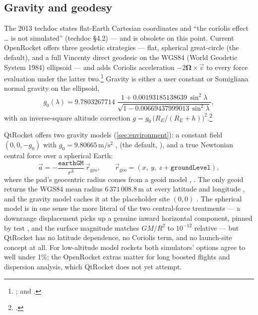 \subsection{Gravity and geodesy}\label{app:or-methods-gravity}

The 2013 techdoc states flat-Earth Cartesian coordinates and ``the coriolis effect \ldots{}
is not simulated'' (techdoc \S 4.2) --- and is obsolete on this point. Current OpenRocket
offers three geodetic strategies --- flat, spherical great-circle (the default), and a full
Vincenty direct geodesic on the WGS84 (World Geodetic System 1984) ellipsoid --- and adds
Coriolis acceleration $-2\boldsymbol{\Omega}\times\vec v$ to every force evaluation under
the latter two.\footnote{;
 and .}
Gravity is either a user constant or Somigliana normal gravity on the ellipsoid,
\begin{equation}
g_0(\lambda) = 9.7803267714\;
\frac{1 + 0.00193185138639\,\sin^2\lambda}{\sqrt{1 - 0.00669437999013\,\sin^2\lambda}},
\end{equation}
with an inverse-square altitude correction
$g = g_0\,\bigl(R_E/(R_E+h)\bigr)^2$.\footnote{.}

QtRocket offers two gravity models (\cref{sec:environment}): a constant field
$(0,0,-g_0)$ with $g_0 = 9.80665\,\mathrm{m/s^2}$ ,
 (the default, ), and a true
Newtonian central force over a spherical Earth:
\begin{equation}
\vec a = -\frac{\mathtt{earthGM}}{r^3}\,\vec r_{\mathrm{geo}},
\qquad \vec r_{\mathrm{geo}} = (x,\ y,\ z + \mathtt{groundLevel}),
\end{equation}
where the pad's geocentric radius comes from a geoid model
, . The only
geoid returns the WGS84 mean radius $6\,371\,008.8$\,m at every latitude and longitude
, and the gravity model caches it at the placeholder
site $(0,0)$ . The spherical model is in one sense
the more literal of the two central-force treatments --- a downrange displacement picks up a
genuine inward horizontal component, pinned by test
, and the surface magnitude matches
$GM/R^2$ to $10^{-12}$ relative  --- but QtRocket
has no latitude dependence, no Coriolis term, and no launch-site concept at all. For
low-altitude model rockets both simulators' options agree to well under 1\%; the OpenRocket
extras matter for long boosted flights and dispersion analysis, which QtRocket does not yet
attempt.

